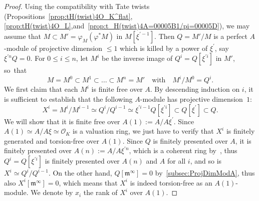 \documentclass[11pt]{article}
\theoremstyle{definition}
\numberwithin{equation}{section}
\numberwithin{figure}{section}
\numberwithin{table}{section}
\begin{document}
\begin{proof}
Using the compatibility with Tate twists (Propositions~\ref{prop:tH(twist)4O_K^flat}, \ref{prop:tH(twist)4O_L},\linebreak and~\ref{prop:t_H(twist)4A=00005B1/pi=00005D}), we may assume that $M\subset M'=\varphi_{M}(\varphi^{\ast}M)$ in $M[\xi^{\prime-1}]$. Then $Q=M'/M$ is a perfect $A$-module of projective dimension $\leq1$ which is killed by a power of $\xi^{\prime}$, say $\xi^{\prime n}Q=0$. For $0\leq i\leq n$, let $M^{i}$ be the inverse image of $Q^{i}=Q[\xi^{\prime i}]$ in $M'$, so~that
\[
M=M^{0}\subset M^{1}\subset\dots\subset M^{n}=M'\quad\text{with}\quad M^{i}/M^{0}=Q^{i}.
\]
We first claim that each $M^{i}$ is finite free over $A$. By descending induction on $i$, it is sufficient to establish that the following $A$-module has projective dimension~$1$:
\[
X^{i}=M^{i}/M^{i-1}\simeq Q^{i}/Q^{i-1}\simeq\xi^{\prime i-1}Q[\xi^{\prime i}]\subset Q[\xi^{\prime}]\subset Q.
\]
We will show that it is finite free over $A(1):=A/A\xi^{\prime}$. Since $A(1)\simeq A/A\xi\simeq\mathcal{O}_{K}$ is a valuation ring, we just have to verify that $X^{i}$ is finitely generated and torsion-free over $A(1)$. Since $Q$ is finitely presented over $A$, it is finitely presented over $A(n):=A/A\xi^{\prime n}$, which is a coherent ring by~\cite[3.24]{BaMoSc16}, thus $Q^{i}=Q[\xi^{\prime i}]$ is finitely presented over $A(n)$ and $A$ for all $i$, and so is $X^{i}\simeq Q^{i}/Q^{i-1}$. On the other hand, $Q[\mathfrak{m}^{\infty}]=0$ by~\ref{subsec:ProjDimModA}, thus also $X^{i}[\mathfrak{m}^{\infty}]=0$, which means that $X^{i}$ is indeed torsion-free as an $A(1)$-module. We denote by $x_{i}$ the rank of $X^{i}$ over $A(1)$.


\end{proof}
\end{document}
